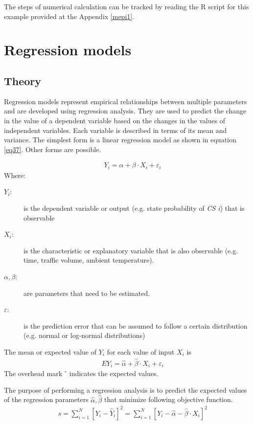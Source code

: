 The steps of numerical calculation can be tracked by reading the R script for this example provided at the Appendix \ref{mepi1}.
%
\section{Regression models} \label{regressionmodel}
\subsection{Theory}
Regression models represent empirical relationships between multiple parameters and are developed using regression analysis. They are used to predict the change in the value of a dependent variable based on the changes in the values of independent variables. Each variable is described in terms of its mean and variance. The simplest form is a linear regression model as shown in equation \ref{eq37}. Other forms are possible.

\begin{eqnarray}
 && {Y_i} = \alpha  + \beta  \cdot {X_i} + {\varepsilon _i} \label{eq37}
\end{eqnarray}
Where:
\begin{adjustwidth}{1cm}{}
\begin{description}
\item[${Y_i}$:] is the dependent variable or output (e.g. state probability of \textit{CS i}) that is observable
\item[${X_i}$:] is the characteristic or explanatory variable that is also observable (e.g. time, traffic volume, ambient temperature).
\item[$\alpha ,\beta $:] are parameters that need to be estimated.
\item[$\varepsilon $:] is the prediction error that can be assumed to follow a certain distribution (e.g. normal or log-normal distributions)
\end{description}
\end{adjustwidth}

The mean or expected value of $Y_i$ for each value of input $X_i$ is
\begin{eqnarray}
 && E{Y_i} = \hat{\alpha}  + \hat{\beta}  \cdot {X_i} + {\varepsilon _i} \label{eq38}
\end{eqnarray}
The overhead mark ${\rm{\hat{\hspace{1mm}}}}$ indicates the expected values.

The purpose of performing a regression analysis is to predict the expected values of the regression parameters $\hat \alpha ,\hat \beta $ that minimize following objective function.
\begin{eqnarray}
 && s = {\sum\limits_{i = 1}^N {\left[ {{Y_i} - {{\hat Y}_i}} \right]} ^2} = {\sum\limits_{i = 1}^N {\left[ {{Y_i} - \hat \alpha  - \hat \beta  \cdot {X_i}} \right]} ^2} \label{eq39}
\end{eqnarray}

